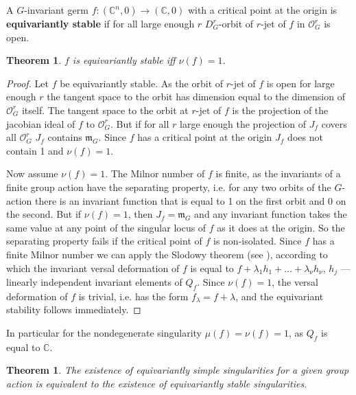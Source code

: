 \documentclass{amsart}
\newtheorem{theorem}[subsection]{Theorem}
\begin{document}
A $G$-invariant germ $f:(\mathbb{C}^n,0) \longrightarrow (\mathbb{C},0)$ with a critical point at the origin is \textbf{equivariantly stable} if for all large enough $r$  $D^r_G$-orbit of $r$-jet of $f$ in  $\mathcal{O}^{r}_{G}$ is open.

\begin{theorem}
$f$ is equivariantly stable iff $\nu(f)=1$.

\end{theorem}
\begin{proof}
Let $f$ be equivariantly stable. As the orbit of $r$-jet of $f$ is open for large enough $r$ the tangent space to the orbit has dimension equal to the dimension of $\mathcal{O}^{r}_{G}$ itself. The tangent space to the orbit  at $r$-jet of $f$ is the projection of the jacobian ideal of $f$ to  $\mathcal{O}^{r}_{G}$. But if for all $r$ large enough the projection of $J_f$ covers all  $\mathcal{O}^{r}_{G}$ $J_f$ contains $\mathfrak{m}_G$. Since $f$ has a critical point at the origin  $J_f$ does not contain 1 and $\nu(f)=1$.

Now assume $\nu(f)=1$. The Milnor number of $f$ is finite, as the invariants of a finite group action have the separating property, i.e. for any two orbits of the $G$-action there is an invariant function that is equal to 1 on the first orbit and 0 on the second. But if $\nu(f)=1$, then $J_f = \mathfrak{m}_G$ and any invariant function takes the same value at any point of the singular locus of $f$ as it does at the origin. So the separating property fails if the critical point of $f$ is non-isolated. Since  $f$ has a finite Milnor number we can apply the Slodowy theorem (see \cite{7}), according to which the invariant versal deformation of $f$ is equal to $f + \lambda_1 h_1 + \ldots + \lambda_{\nu} h_{\nu}$, $h_j$ --- linearly independent invariant elements of $Q_f$. Since $\nu(f)=1$, the versal deformation of $f$ is trivial, i.e. has the form $f_{\lambda} = f + \lambda$, and the equivariant stability follows immediately.
\end{proof}
In particular for the nondegenerate singularity $\mu(f)=\nu(f)=1$, as $Q_f$ is equal to $\mathbb{C}$.


\begin{theorem}The existence of equivariantly simple singularities for a given group action is equivalent to the existence of equivariantly stable singularities.
\end{theorem}
\end{document}
